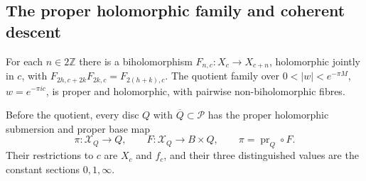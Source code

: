 \subsection{The proper holomorphic family and coherent descent}\hypertarget{tag-01PC}{}\label{fam:section:A.3}

\begin{proposition}\hypertarget{tag-01Q2}{}\label{fam:src:A.3.1}\label{fam:st:A.3.1}

For each $n\in2\mathbb Z$ there is a biholomorphism $F_{n,c}:X_c\to X_{c+n}$, holomorphic jointly in $c$, with $F_{2h,c+2k}F_{2k,c}=F_{2(h+k),c}$. The quotient family over $0<|w|<e^{-\pi M}$, $w=e^{-\pi ic}$, is proper and holomorphic, with pairwise non-biholomorphic fibres.

Before the quotient, every disc $Q$ with $\overline Q\subset\mathcal P$
has the proper holomorphic submersion and proper base map
\[
 \pi:\mathcal X_Q\longrightarrow Q,\qquad
 F:\mathcal X_Q\longrightarrow B\times Q,\qquad
 \pi=\operatorname{pr}_Q\circ F.
 \tag{PD2}
\]
Their restrictions to $c$ are $X_c$ and $f_c$, and their three
distinguished values are the constant sections $0,1,\infty$.
\end{proposition}
